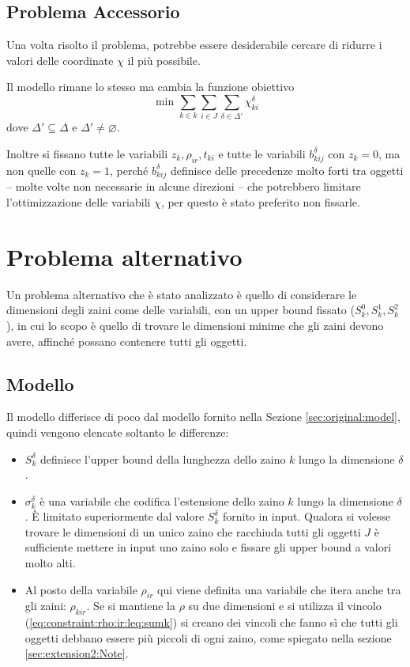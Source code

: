 \documentclass{scrartcl}
\begin{document}
\subsection{Problema Accessorio}
\label{sec:orig:problemaAcessorio}
Una volta risolto il problema, potrebbe essere desiderabile cercare di ridurre i valori delle coordinate
$\chi$ il più possibile.

Il modello rimane lo stesso ma cambia la funzione obiettivo
\begin{equation}
\text{ min } \sum_{k\in k}\sum_{i \in J}\sum_{\delta \in \Delta'} \chi_{ki}^\delta
\end{equation}
dove $\Delta' \subseteq \Delta$ e $\Delta' \neq \varnothing$.

Inoltre si fissano tutte le variabili $z_k, \rho_{ir}, t_{ki}$ e tutte le variabili $b_{kij}^\delta$ con $z_k = 0$, ma non quelle con $z_k = 1$, perché $b_{kij}^\delta$ definisce delle precedenze molto forti tra oggetti -- molte volte non necessarie in alcune direzioni -- che potrebbero limitare l'ottimizzazione delle variabili $\chi$, per questo è stato preferito non fissarle.


\section{Problema alternativo}
\label{sec:extension2}
Un problema alternativo che è  stato analizzato è quello di considerare le dimensioni degli zaini come delle variabili, con un upper bound fissato ($S_k^0, S_k^1, S_k^2$), in cui lo scopo è quello di trovare le dimensioni minime che gli zaini devono avere, affinché possano contenere tutti gli oggetti.

\subsection{Modello}
Il modello differisce di poco dal modello fornito nella
Sezione \ref{sec:original:model}, quindi vengono elencate soltanto le differenze:
\begin{itemize}
	\item $S_k^\delta$ definisce l'upper bound della lunghezza dello zaino $k$ lungo la dimensione $\delta$.
	
	\item $\sigma_k^\delta$ è una variabile che codifica l'estensione dello zaino $k$ lungo la dimensione $\delta$. È limitato superiormente dal valore $S_k^\delta$ fornito in input.
	Qualora si volesse trovare le dimensioni di un unico zaino che racchiuda tutti gli oggetti $J$ è sufficiente	mettere in input uno zaino solo e fissare gli upper bound a valori molto alti. 
	
	\item Al posto della variabile $\rho_{ir}$ qui viene definita una variabile che itera anche tra gli zaini: $\rho_{kir}$. 
	Se si mantiene la $\rho$ su due dimensioni e si utilizza il vincolo (\ref{eq:constraint:rho:ir:leq:sumk}) si creano dei vincoli che fanno sì che tutti gli oggetti debbano essere più piccoli di ogni zaino, come spiegato nella sezione \ref{sec:extension2:Note}.
\end{itemize}
\end{document}
